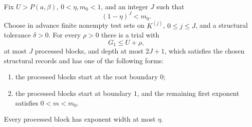 \begin{proposition}\label{cc:terminal}
Fix $U>P(a,\beta)$, $0<\eta,m_0<1$, and an integer $J$ such that
\begin{equation}\label{cc:stopping-depth}
 (1-\eta)^J<m_0.
\end{equation}
Choose in advance finite nonempty test sets on $K^{(j)}$, $0\le j\le J$,
and a structural tolerance $\delta>0$.  For every $\rho>0$ there is a
trial with
\[
 G_1\le U+\rho,
\]
at most $J$ processed blocks, and depth at most $2J+1$, which satisfies
the chosen structural records and has one of the following forms:
\begin{enumerate}
 \item the processed blocks start at the root boundary $0$;
 \item the processed blocks start at boundary $1$, and the remaining
       first exponent satisfies $0<m<m_0$.
\end{enumerate}
Every processed block has exponent width at most $\eta$.
\end{proposition}

